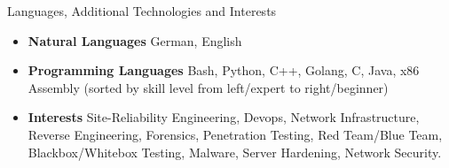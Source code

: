 \documentclass[]{mcdowellcv}
\begin{document}
\begin{cvsection}{Languages, Additional Technologies and Interests}
\begin{cvsubsection}{}{}{}
\begin{itemize}
\item \textbf{Natural Languages} German, English
\item \textbf{Programming Languages} Bash, Python, C++, Golang, C, Java, x86 Assembly (sorted by skill level from left/expert to right/beginner)
\item \textbf{Interests} Site-Reliability Engineering, Devops, Network Infrastructure, Reverse Engineering, Forensics, Penetration Testing, Red Team/Blue Team, Blackbox/Whitebox Testing, Malware, Server Hardening, Network Security.
\end{itemize}
\end{cvsubsection}
\end{cvsection}
\end{document}
